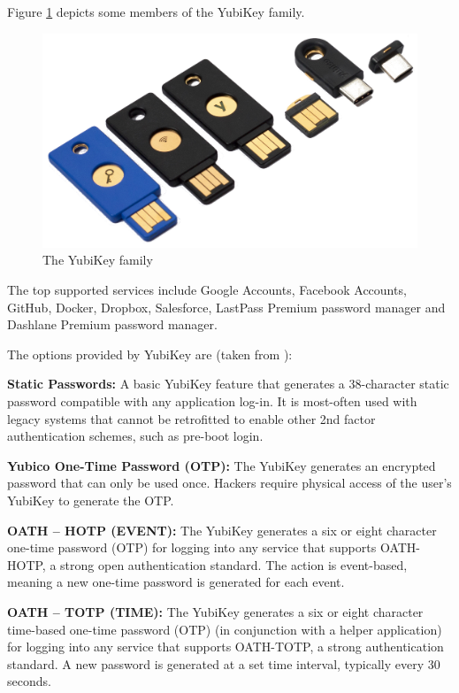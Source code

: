 Figure \ref{fig:yubi} depicts some members of the YubiKey family.

\begin{figure}[htb]
  \centering
  \captionsetup{justification=centering}
  \centerline{\includegraphics[width=0.8\columnwidth]{chapters/figures/related/yubikeyfam.jpg}}
  \caption{The YubiKey family}
  \label{fig:yubi}
\end{figure}

The top supported services include Google Accounts, Facebook Accounts, GitHub, Docker, Dropbox, Salesforce, LastPass Premium password manager and Dashlane Premium password manager.

The options provided by YubiKey are (taken from \cite{yubiworks}):

\textbf{Static Passwords: }A basic YubiKey feature that generates a 38-character static password compatible with any application log-in. It is most-often used with legacy systems that cannot be retrofitted to enable other 2nd factor authentication schemes, such as pre-boot login. 

\textbf{Yubico One-Time Password (OTP): }The YubiKey generates an encrypted password that can only be used once. Hackers require physical access of the user's YubiKey to generate the OTP. 

\textbf{OATH – HOTP (EVENT): }
The YubiKey generates a six or eight character one-time password (OTP) for logging into any service that supports OATH-HOTP, a strong open authentication standard. The action is event-based, meaning a new one-time password is generated for each event.

\textbf{OATH – TOTP (TIME): }
The YubiKey generates a six or eight character time-based one-time password (OTP) (in conjunction with a helper application) for logging into any service that supports OATH-TOTP, a strong authentication standard. A new password is generated at a set time interval, typically every 30 seconds.

